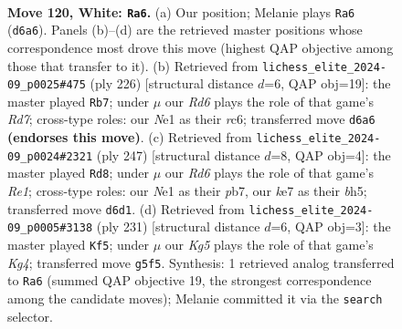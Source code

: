 \documentclass[11pt]{article}
\begin{document}
\clearpage

\begin{figure}[p]\centering
\begin{subfigure}{0.46\textwidth}\centering
\resizebox{\linewidth}{!}{%
\newchessgame
\chessboard[
  setfen={8/4k3/3R4/6K1/6P1/1r6/8/4N3 w - - 23 120},
  showmover=false,
  pgfstyle=straightmove, color=movearrow, markmove={d6-a6}
]}
\caption{}
\end{subfigure}\hfill
\begin{subfigure}{0.46\textwidth}\centering
\resizebox{\linewidth}{!}{%
\newchessgame
\chessboard[
  setfen={4k3/3R4/2r5/5PK1/8/8/8/8 w - - 15 114},
  showmover=false,
  pgfstyle=straightmove, color=movearrow, markmove={d7-b7}
]}
\caption{}
\end{subfigure}
\\[4pt]
\begin{subfigure}{0.46\textwidth}\centering
\resizebox{\linewidth}{!}{%
\newchessgame
\chessboard[
  setfen={4r3/1P6/8/7B/2p5/2k5/8/2K5 b - - 91 124},
  showmover=false,
  pgfstyle=straightmove, color=movearrow, markmove={e8-d8}
]}
\caption{}
\end{subfigure}\hfill
\begin{subfigure}{0.46\textwidth}\centering
\resizebox{\linewidth}{!}{%
\newchessgame
\chessboard[
  setfen={8/R7/6p1/6k1/8/8/7r/4K3 b - - 1 116},
  showmover=false,
  pgfstyle=straightmove, color=movearrow, markmove={g5-f5}
]}
\caption{}
\end{subfigure}
\caption{\textbf{Move 120, White: \texttt{Ra6}.} (a) Our position; Melanie plays \texttt{Ra6} (\texttt{d6a6}). Panels (b)--(d) are the retrieved master positions whose correspondence most drove this move (highest QAP objective among those that transfer to it). (b) Retrieved from \texttt{lichess\_elite\_2024-09\_p0025\#475} (ply 226) [structural distance $d$=6, QAP obj=19]: the master played \texttt{Rb7}; under $\mu$ our \emph{Rd6} plays the role of that game's \emph{Rd7}; cross-type roles: our \emph{N}e1 as their \emph{r}c6; transferred move \texttt{d6a6} \textbf{(endorses this move)}. (c) Retrieved from \texttt{lichess\_elite\_2024-09\_p0024\#2321} (ply 247) [structural distance $d$=8, QAP obj=4]: the master played \texttt{Rd8}; under $\mu$ our \emph{Rd6} plays the role of that game's \emph{Re1}; cross-type roles: our \emph{N}e1 as their \emph{p}b7, our \emph{k}e7 as their \emph{b}h5; transferred move \texttt{d6d1}. (d) Retrieved from \texttt{lichess\_elite\_2024-09\_p0005\#3138} (ply 231) [structural distance $d$=6, QAP obj=3]: the master played \texttt{Kf5}; under $\mu$ our \emph{Kg5} plays the role of that game's \emph{Kg4}; transferred move \texttt{g5f5}. Synthesis: 1 retrieved analog transferred to \texttt{Ra6} (summed QAP objective 19, the strongest correspondence among the candidate moves); Melanie committed it via the \texttt{search} selector.}
\label{fig:thought-m238}
\end{figure}
\end{document}
